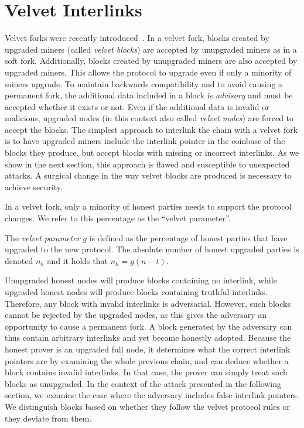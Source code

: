 \section{Velvet Interlinks}\label{sec:velvet}
Velvet forks were recently introduced~\cite{velvet}. In a
velvet fork, blocks created by upgraded miners (called \emph{velvet blocks}) are
accepted by unupgraded miners as in a soft fork. Additionally, blocks created by
unupgraded miners are also accepted by upgraded miners. This allows the protocol
to upgrade even if only a minority of miners upgrade. To maintain
backwards compatibility and to avoid causing a permanent fork, the additional data included
in a block is \emph{advisory} and must be accepted whether it exists or not.
Even if the additional data is invalid or malicious, upgraded nodes (in this
context also called \emph{velvet nodes}) are forced to accept the blocks. The
simplest approach to interlink the chain with a velvet fork is to have
upgraded miners include the interlink pointer in the coinbase of the blocks they produce, but
accept blocks with missing or incorrect interlinks. As we show in the next
section, this approach is flawed and susceptible to unexpected attacks. A
surgical change in the way velvet blocks are produced is necessary to achieve
security.

In a velvet fork, only a minority of honest parties needs to support the protocol
changes. We refer to this percentage as the ``velvet parameter''.

\begin{definition}
	The \emph{velvet parameter} $g$ is defined as the percentage of honest parties
	that have upgraded to the new protocol. The absolute number of honest upgraded
	parties is denoted $n_h$ and it holds that
	$n_h = g (n - t)$.
	\label{defn:velvet_honest_majority}
\end{definition}

Unupgraded honest nodes will produce blocks
containing no interlink, while upgraded honest nodes will produce blocks
containing truthful interlinks. Therefore, any block with invalid interlinks is
adversarial. However, such blocks cannot be rejected by the
upgraded nodes, as this gives the adversary an opportunity to cause a permanent
fork. A block generated by the adversary can thus contain arbitrary interlinks
and yet become honestly adopted. Because the honest prover is an
upgraded full node, it determines what the correct interlink pointers are by
examining the whole previous chain, and can deduce whether a block contains
invalid interlinks. In that case, the prover can simply treat such blocks as
unupgraded. In the context of the attack presented in the following
section, we examine the case where the adversary includes false interlink
pointers. We distinguish blocks based on whether they follow the velvet protocol
rules or they deviate from them.

